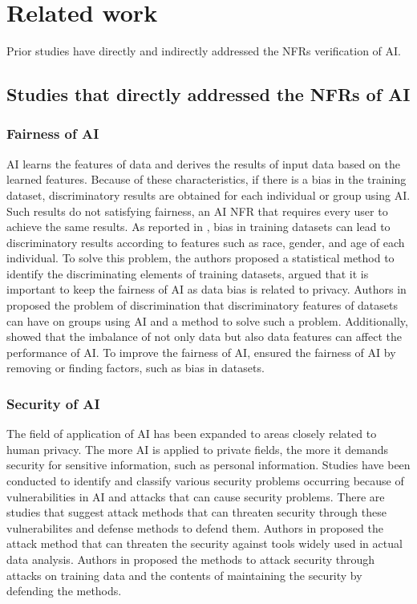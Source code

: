 \documentclass[journal,article,submit,moreauthors,pdftex]{Definitions/mdpi}
\begin{document}
\section{Related work}

Prior studies have directly and indirectly addressed the NFRs verification of AI.

\subsection{Studies that directly addressed the NFRs of AI}

\subsubsection{Fairness of AI}

AI learns the features of data and derives the results of input data based on the learned features.
Because of these characteristics, if there is a bias in the training dataset, discriminatory results are obtained for each individual or group using AI.
Such results do not satisfying fairness, an AI NFR that requires every user to achieve the same results.
As reported in \cite{fairness-dwork, fairness-zemel}, bias in training datasets can lead to discriminatory results according to features such as race, gender, and age of each individual.
To solve this problem, the authors proposed a statistical method to identify the discriminating elements of training datasets, argued that it is important to keep the fairness of AI as data bias is related to privacy.
Authors in \cite{fairness-feldman} proposed the problem of discrimination that discriminatory features of datasets can have on groups using AI and a method to solve such a problem.
Additionally, \cite{fairness-zhang} showed that the imbalance of not only data but also data features can affect the performance of AI.
To improve the fairness of AI, \cite{fairness-feldman,fairness-microsoft, fairness-tramer} ensured the fairness of AI by removing or finding factors, such as bias in datasets.

\subsubsection{Security of AI}

The field of application of AI has been expanded to areas closely related to human privacy.
The more AI is applied to private fields, the more it demands security for sensitive information, such as personal information.
Studies have been conducted to identify and classify various security problems occurring because of vulnerabilities in AI and attacks that can cause security problems\cite{security-barreno}.
There are studies that suggest attack methods that can threaten security through these vulnerabilites and defense methods to defend them.
Authors in \cite{security-mei2} proposed the attack method that can threaten the security against tools widely used in actual data analysis.
Authors in \cite{security-mei} proposed the methods to attack security through attacks on training data and the contents of maintaining the security by defending the methods.
\end{document}
